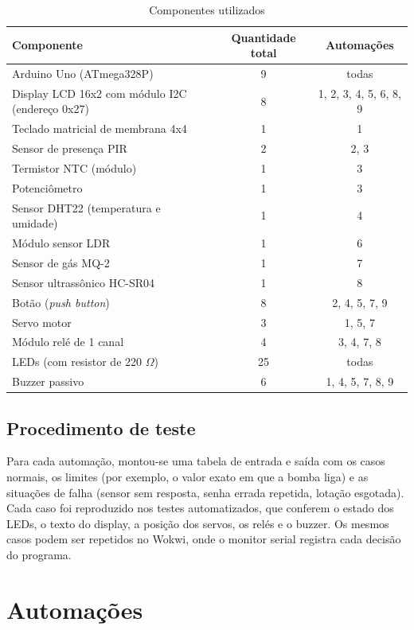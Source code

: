 \documentclass[12pt]{article}
\begin{document}
\begin{table}[!htb]
\centering
\caption{Componentes utilizados}\label{tab:componentes}
\small
\begin{tabularx}{\textwidth}{Xcc}
\toprule
Componente & Quantidade total & Automações \\
\midrule
Arduino Uno (ATmega328P) & 9 & todas \\
Display LCD 16x2 com módulo I2C (endereço 0x27) & 8 & 1, 2, 3, 4, 5, 6, 8, 9 \\
Teclado matricial de membrana 4x4 & 1 & 1 \\
Sensor de presença PIR & 2 & 2, 3 \\
Termistor NTC (módulo) & 1 & 3 \\
Potenciômetro & 1 & 3 \\
Sensor DHT22 (temperatura e umidade) & 1 & 4 \\
Módulo sensor LDR & 1 & 6 \\
Sensor de gás MQ-2 & 1 & 7 \\
Sensor ultrassônico HC-SR04 & 1 & 8 \\
Botão (\emph{push button}) & 8 & 2, 4, 5, 7, 9 \\
Servo motor & 3 & 1, 5, 7 \\
Módulo relé de 1 canal & 4 & 3, 4, 7, 8 \\
LEDs (com resistor de 220 $\Omega$) & 25 & todas \\
Buzzer passivo & 6 & 1, 4, 5, 7, 8, 9 \\
\bottomrule
\end{tabularx}
\end{table}

\subsection{Procedimento de teste}

Para cada automação, montou-se uma tabela de entrada e saída com os casos normais, os limites (por exemplo, o valor exato em que a bomba liga) e as situações de falha (sensor sem resposta, senha errada repetida, lotação esgotada). Cada caso foi reproduzido nos testes automatizados, que conferem o estado dos LEDs, o texto do display, a posição dos servos, os relés e o buzzer. Os mesmos casos podem ser repetidos no Wokwi, onde o monitor serial registra cada decisão do programa.

\section{Automações}\label{sec:automacoes}
\end{document}
